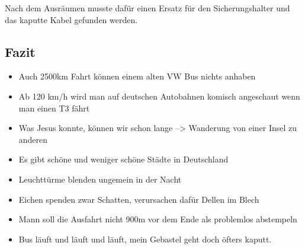 Nach dem Ausräumen musste dafür einen Ersatz für den Sicherungshalter und das kaputte Kabel gefunden werden.

\subsection{Fazit}
\begin{itemize}
     \item Auch 2500km Fahrt können einem alten VW Bus nichts anhaben
     \item Ab 120 km/h wird man auf deutschen Autobahnen komisch angeschaut wenn man einen T3 fährt
     \item Was Jesus konnte, können wir schon lange --> Wanderung von einer Insel zu anderen
     \item Es gibt schöne und weniger schöne Städte in Deutschland
     \item Leuchttürme blenden ungemein in der Nacht
     \item Eichen spenden zwar Schatten, verursachen dafür Dellen im Blech
     \item Mann soll die Ausfahrt nicht 900m vor dem Ende als problemlos abstempeln
     \item Bus läuft und läuft und läuft, mein Gebastel geht doch öfters kaputt.
\end{itemize} 
